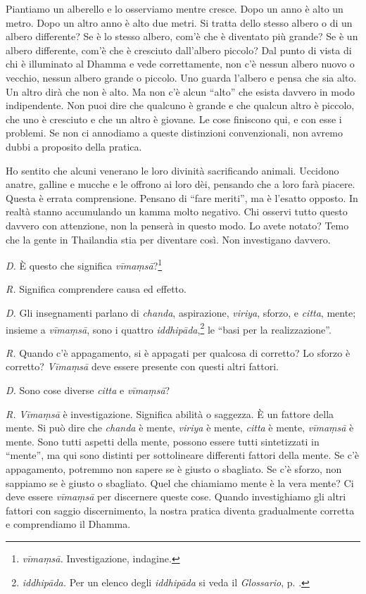 Piantiamo un alberello e lo osserviamo mentre cresce. Dopo un anno è
alto un metro. Dopo un altro anno è alto due metri. Si tratta dello
stesso albero o di un albero differente? Se è lo stesso albero, com'è
che è diventato più grande? Se è un albero differente, com'è che è
cresciuto dall'albero piccolo? Dal punto di vista di chi è illuminato al
Dhamma e vede correttamente, non c'è nessun albero nuovo o vecchio,
nessun albero grande o piccolo. Uno guarda l'albero e pensa che sia
alto. Un altro dirà che non è alto. Ma non c'è alcun ``alto'' che esista
davvero in modo indipendente. Non puoi dire che qualcuno è grande e che
qualcun altro è piccolo, che uno è cresciuto e che un altro è giovane.
Le cose finiscono qui, e con esse i problemi. Se non ci annodiamo a
queste distinzioni convenzionali, non avremo dubbi a proposito della
pratica.

Ho sentito che alcuni venerano le loro divinità sacrificando animali.
Uccidono anatre, galline e mucche e le offrono ai loro dèi, pensando che
a loro farà piacere. Questa è errata comprensione. Pensano di ``fare
meriti'', ma è l'esatto opposto. In realtà stanno accumulando un
kamma molto negativo. Chi osservi tutto questo davvero con
attenzione, non la penserà in questo modo. Lo avete notato? Temo che la
gente in Thailandia stia per diventare così. Non investigano davvero.

\emph{D.} È questo che significa \emph{vīmaṃsā}?\footnote{\emph{vīmaṃsā.}
  Investigazione, indagine.}

\emph{R.} Significa comprendere causa ed effetto.

\emph{D.} Gli insegnamenti parlano di \emph{chanda}, aspirazione,
\emph{viriya}, sforzo, e \emph{citta}, mente; insieme a \emph{vīmaṃsā},
sono i quattro \emph{iddhipāda},\footnote{\emph{iddhipāda.} Per un
  elenco degli \emph{iddhipāda} si veda il \emph{Glossario}, p. \pageref{glossary-iddhipada}.} le ``basi
per la realizzazione''.

\emph{R.} Quando c'è appagamento, si è appagati per qualcosa di corretto? Lo
sforzo è corretto? \emph{Vīmaṃsā} deve essere presente con questi altri
fattori.

\emph{D.} Sono cose diverse \emph{citta} e \emph{vīmaṃsā}?

\emph{R.} \emph{Vīmaṃsā} è investigazione. Significa abilità o saggezza. È un
fattore della mente. Si può dire che \emph{chanda} è mente,
\emph{viriya} è mente, \emph{citta} è mente, \emph{vīmaṃsā} è mente.
Sono tutti aspetti della mente, possono essere tutti sintetizzati in
``mente'', ma qui sono distinti per sottolineare differenti fattori
della mente. Se c'è appagamento, potremmo non sapere se è giusto o
sbagliato. Se c'è sforzo, non sappiamo se è giusto o sbagliato. Quel che
chiamiamo mente è la vera mente? Ci deve essere \emph{vīmaṃsā} per
discernere queste cose. Quando investighiamo gli altri fattori con
saggio discernimento, la nostra pratica diventa gradualmente corretta e
comprendiamo il Dhamma.

